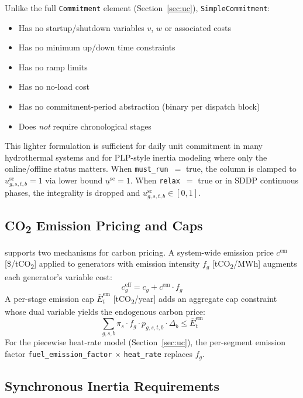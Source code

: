Unlike the full \texttt{Commitment} element (Section~\ref{sec:uc}),
\texttt{SimpleCommitment}:
\begin{itemize}
  \item Has no startup/shutdown variables $v$, $w$ or associated costs
  \item Has no minimum up/down time constraints
  \item Has no ramp limits
  \item Has no no-load cost
  \item Has no commitment-period abstraction (binary per dispatch block)
  \item Does \emph{not} require chronological stages
\end{itemize}
This lighter formulation is sufficient for daily unit commitment in many
hydrothermal systems and for PLP-style inertia modeling where only the
online/offline status matters.  When \texttt{must\_run}~$=$ true, the
column is clamped to $u_{g,s,t,b}^{\text{sc}} = 1$ via lower bound
$\underline{u}^{\text{sc}} = 1$.  When \texttt{relax}~$=$ true or in
SDDP continuous phases, the integrality is dropped and
$u_{g,s,t,b}^{\text{sc}} \in [0,1]$.

\subsection{CO\textsubscript{2} Emission Pricing and Caps}
\label{sec:emission}

\gtopt{} supports two mechanisms for carbon pricing.  A system-wide emission
price $c^{\text{em}}$ [\$/tCO\textsubscript{2}] applied to generators
with emission intensity $f_g$ [tCO\textsubscript{2}/MWh] augments each
generator's variable cost:
\begin{equation}
\label{eq:emission_cost}
c_g^{\text{eff}} = c_g + c^{\text{em}} \cdot f_g
\end{equation}
A per-stage emission cap $\overline{E}^{\text{em}}_t$
[tCO\textsubscript{2}/year] adds an aggregate cap constraint whose
dual variable yields the endogenous carbon price:
\begin{equation}
\label{eq:emission_cap}
\sum_{g,s,b} \pi_s \cdot f_g \cdot p_{g,s,t,b} \cdot \Delta_b
  \leq \overline{E}^{\text{em}}_t
\end{equation}
For the piecewise heat-rate model (Section~\ref{sec:uc}), the per-segment
emission factor \texttt{fuel\_emission\_factor} $\times$ \texttt{heat\_rate}
replaces $f_g$.

\subsection{Synchronous Inertia Requirements}
\label{sec:inertia}

